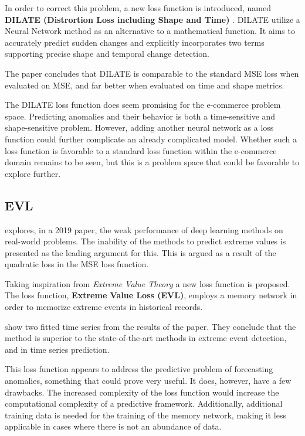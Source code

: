 In order to correct this problem, a new loss function is introduced, named
\textbf{DILATE (Distrortion Loss including Shape and Time)} \cite{Guen2019}.
DILATE utilize a Neural Network method as an alternative to a mathematical function.
It aims to accurately predict sudden changes and explicitly incorporates two terms
supporting precise shape and temporal change detection.

The paper concludes that DILATE is comparable to the standard MSE loss when evaluated on MSE,
and far better when evaluated on time and shape metrics.

The DILATE loss function does seem promising for the e-commerce problem space.
Predicting anomalies and their behavior is both a time-sensitive and shape-sensitive problem.
However, adding another neural network as a loss function could further complicate an already complicated model.
Whether such a loss function is favorable to a standard loss function within the e-commerce domain remains to be seen,
but this is a problem space that could be favorable to explore further.

\subsection{EVL}
\citeauthor{Ding2019} explores, in a 2019 paper, the weak performance of deep learning methods on real-world problems.
The inability of the methods to predict extreme values is presented as the leading argument for this.
This is argued as a result of the quadratic loss in the MSE loss function.

Taking inspiration from \textit{Extreme Value Theory} a new loss function is proposed.
The loss function, \textbf{Extreme Value Loss (EVL)},
employs a memory network in order to memorize extreme events in historical records.

 show two fitted time series from the results of the paper. They conclude
that the method is superior to the state-of-the-art methods in extreme event detection, and
in time series prediction.

This loss function appears to address the predictive problem of forecasting anomalies,
something that could prove very useful.
It does, however, have a few drawbacks.
The increased complexity of the loss function would increase the computational complexity of a predictive framework.
Additionally, additional training data is needed for the training of the memory network,
making it less applicable in cases where there is not an abundance of data.

